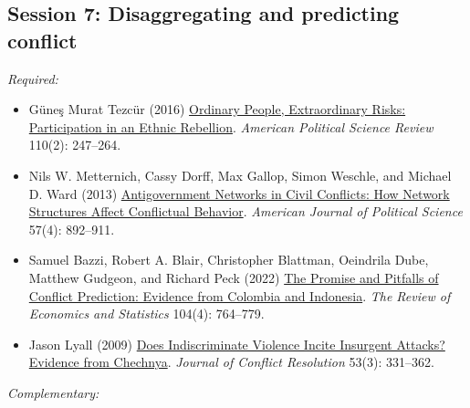 \documentclass[12pt, a4paper]{article}
\begin{document}


\vspace{20pt}
\hline
\subsection*{Session 7: Disaggregating and predicting conflict}

\noindent\textit{Required:}

\begin{itemize}
	\item Güne\c{s} Murat Tezcür (2016) \href{https://doi.org/10.1017/S0003055416000150}{Ordinary People, Extraordinary Risks: Participation in an Ethnic Rebellion}. \textit{American Political Science Review} 110(2): 247--264.
	\item Nils W. Metternich, Cassy Dorff, Max Gallop, Simon Weschle, and Michael D. Ward (2013) \href{https://doi.org/10.1111/ajps.12039}{Antigovernment Networks in Civil Conflicts: How Network Structures Affect Conflictual Behavior}. \textit{American Journal of Political Science} 57(4): 892--911.
	\item Samuel Bazzi, Robert A. Blair, Christopher Blattman, Oeindrila Dube, Matthew Gudgeon, and Richard Peck (2022) \href{https://doi.org/10.1162/rest_a_01016}{The Promise and Pitfalls of Conflict Prediction: Evidence from Colombia and Indonesia}. \textit{The Review of Economics and Statistics} 104(4): 764--779.
	\item Jason Lyall (2009) \href{https://doi.org/10.1177/0022002708330881}{Does Indiscriminate Violence Incite Insurgent Attacks? Evidence from Chechnya}. \textit{Journal of Conflict Resolution} 53(3): 331--362.
\end{itemize}


\noindent\textit{Complementary:}
\end{document}
